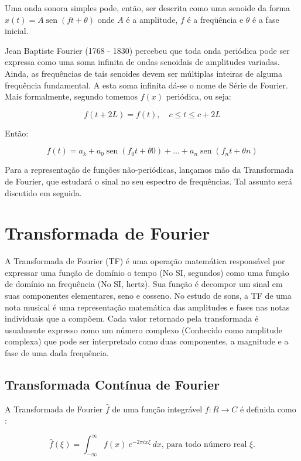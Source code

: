 \documentclass[brazil,times]{abnt}
\begin{document}
	Uma onda sonora simples pode, então, ser descrita como uma senoide da forma $x(t) = A \operatorname{sen} (ft + \theta)$ onde $A$ é a amplitude, $f$ é a freqüência e $\theta$ é a fase inicial.

	Jean Baptiste Fourier (1768 - 1830) percebeu que toda onda periódica pode ser expressa como uma soma infinita de ondas senoidais de amplitudes variadas. Ainda, as frequências de tais senoides devem ser múltiplas inteiras de alguma frequência fundamental. A esta soma infinita dá-se o nome de Série de Fourier. \cite{burk2005music} Mais formalmente, segundo \cite{wiki:serie-fourier} tomemos $f(x)$ periódica, ou seja:


	$$f(t + 2L) = f(t), \quad c \le t \le c + 2L$$

	Então:

	$$f(t) = a_k + a_0\operatorname{sen}(f_0t + \theta 0) +... + a_n\operatorname{sen} (f_nt + \theta n)$$


	Para a representação de funções não-periódicas, lançamos mão da Transformada de Fourier, que estudará o sinal no seu espectro de frequências. Tal assunto será discutido em seguida.

\section*{Transformada de Fourier}
	A Transformada de Fourier (TF) é uma operação matemática responsável por expressar uma função de domínio o tempo (No SI, segundos) como uma função de domínio na frequência (No SI, hertz). Sua função é decompor um sinal em suas componentes elementares, seno e cosseno. \cite{ufcg:transformada-fourier} No estudo de sons, a TF de uma nota musical é uma representação matemática das amplitudes e fases nas notas individuais que a compõem. Cada valor retornado pela transformada é usualmente expresso como um número complexo (Conhecido como amplitude complexa) que pode ser interpretado como duas componentes, a magnitude e a fase de uma dada frequência.


	\subsection*{Transformada Contínua de Fourier}
		A Transformada de Fourier $\hat{f}$ de uma função integrável $f: R \rightarrow C$ é definida como \cite{wiki:fourier-transform}:

		$$\hat{f}(\xi) = \int_{-\infty}^{\infty} f(x)\ e^{- 2\pi i x \xi}\,dx \text{, para todo número real } \xi.$$
\end{document}

